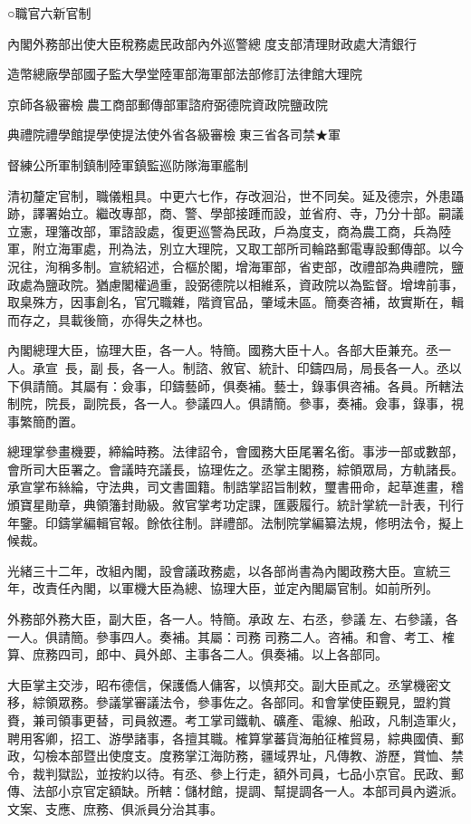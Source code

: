 
\begin{pinyinscope}
○職官六新官制

內閣外務部出使大臣稅務處民政部內外巡警總度支部清理財政處大清銀行

造幣總廠學部國子監大學堂陸軍部海軍部法部修訂法律館大理院

京師各級審檢農工商部郵傳部軍諮府弼德院資政院鹽政院

典禮院禮學館提學使提法使外省各級審檢東三省各司禁★軍

督練公所軍制鎮制陸軍鎮監巡防隊海軍艦制

清初釐定官制，職儀粗具。中更六七作，存改洄沿，世不同矣。延及德宗，外患躡跡，譯署始立。繼改專部，商、警、學部接踵而設，並省府、寺，乃分十部。嗣議立憲，理籓改部，軍諮設處，復更巡警為民政，戶為度支，商為農工商，兵為陸軍，附立海軍處，刑為法，別立大理院，又取工部所司輪路郵電專設郵傳部。以今況往，洵稱多制。宣統紹述，合樞於閣，增海軍部，省吏部，改禮部為典禮院，鹽政處為鹽政院。猶慮閣權過重，設弼德院以相維系，資政院以為監督。增埤前事，取臬殊方，因事創名，官冗職雜，階資官品，肇域未區。簡奏咨補，故實斯在，輯而存之，具載後簡，亦得失之林也。

內閣總理大臣，協理大臣，各一人。特簡。國務大臣十人。各部大臣兼充。丞一人。承宣長，副長，各一人。制諮、敘官、統計、印鑄四局，局長各一人。丞以下俱請簡。其屬有：僉事，印鑄藝師，俱奏補。藝士，錄事俱咨補。各員。所轄法制院，院長，副院長，各一人。參議四人。俱請簡。參事，奏補。僉事，錄事，視事繁簡酌置。

總理掌參畫機要，締綸時務。法律詔令，會國務大臣尾署名銜。事涉一部或數部，會所司大臣署之。會議時充議長，協理佐之。丞掌主閣務，綜領眾局，方軌諸長。承宣掌布絲綸，守法典，司文書圖籍。制誥掌詔旨制敕，璽書冊命，起草進畫，稽頒寶星勛章，典領籓封勛級。敘官掌考功定課，匯覈履行。統計掌統一計表，刊行年鑒。印鑄掌編輯官報。餘依往制。詳禮部。法制院掌編纂法規，修明法令，擬上候裁。

光緒三十二年，改組內閣，設會議政務處，以各部尚書為內閣政務大臣。宣統三年，改責任內閣，以軍機大臣為總、協理大臣，並定內閣屬官制。如前所列。

外務部外務大臣，副大臣，各一人。特簡。承政左、右丞，參議左、右參議，各一人。俱請簡。參事四人。奏補。其屬：司務司務二人。咨補。和會、考工、榷算、庶務四司，郎中、員外郎、主事各二人。俱奏補。以上各部同。

大臣掌主交涉，昭布德信，保護僑人傭客，以慎邦交。副大臣貳之。丞掌機密文移，綜領眾務。參議掌審議法令，參事佐之。各部同。和會掌使臣覲見，盟約賞賚，兼司領事更替，司員敘遷。考工掌司鐵軌、礦產、電線、船政，凡制造軍火，聘用客卿，招工、游學諸事，各擅其職。榷算掌蕃貨海舶征榷貿易，綜典國債、郵政，勾檢本部暨出使度支。度務掌江海防務，疆域界址，凡傳教、游歷，賞恤、禁令，裁判獄訟，並按約以待。有丞、參上行走，額外司員，七品小京官。民政、郵傳、法部小京官定額缺。所轄：儲材館，提調、幫提調各一人。本部司員內遴派。文案、支應、庶務、俱派員分治其事。


\end{pinyinscope}
